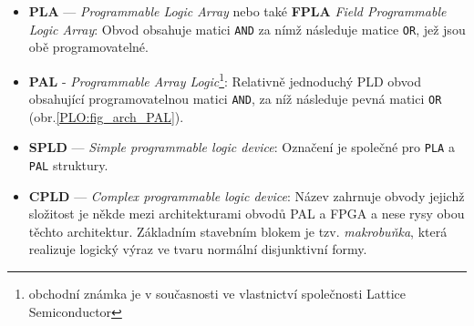       \begin{itemize}
        \item \textbf{PLA} — \emph{Programmable Logic Array} nebo také \textbf{FPLA} \emph{Field
              Programmable Logic Array}: Obvod obsahuje matici \texttt{AND} za nímž následuje matice
              \texttt{OR}, jež jsou obě programovatelné.
        \item \textbf{PAL} - \emph{Programmable Array Logic}\footnote{obchodní známka je v
              současnosti ve vlastnictví společnosti Lattice Semiconductor}: Relativně jednoduchý
              PLD obvod obsahující programovatelnou matici \texttt{AND}, za níž následuje pevná
              matici \texttt{OR} (obr.\ref{PLO:fig_arch_PAL}). %
        \item \textbf{SPLD} — \emph{Simple programmable logic device}: Označení je společné pro   
              \texttt{PLA} a \texttt{PAL} struktury.
        \item \textbf{CPLD} — \emph{Complex programmable logic device}: Název zahrnuje obvody   
              jejichž složitost je někde mezi architekturami obvodů PAL a FPGA a nese rysy obou 
              těchto architektur. Základním stavebním blokem je tzv. \emph{makrobuňka}, která 
              realizuje logický výraz ve tvaru normální disjunktivní formy.   

\end{itemize}
